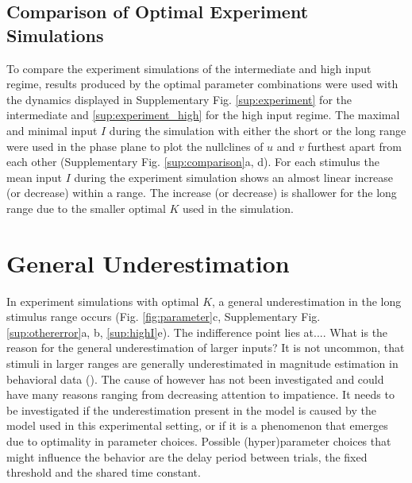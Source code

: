 \documentclass[10pt]{article}
\begin{document}
\subsection{Comparison of Optimal Experiment Simulations}
To compare the experiment simulations of the intermediate and high input regime, results produced by the optimal parameter combinations were used with the dynamics displayed in Supplementary Fig. \ref{sup:experiment} for the intermediate and \ref{sup:experiment_high} for the high input regime.
The maximal and minimal input $I$ during the simulation with either the short or the long range were used in the phase plane to plot the nullclines of $u$ and $v$ furthest apart from each other (Supplementary Fig. \ref{sup:comparison}a, d).
For each stimulus the mean input $I$ during the experiment simulation shows an almost linear increase (or decrease) within a range. The increase (or decrease) is shallower for the long range due to the smaller optimal $K$ used in the simulation. 

\section{General Underestimation}
In experiment simulations with optimal $K$, a general underestimation in the long stimulus range occurs (Fig. \ref{fig:parameter}c, Supplementary Fig. \ref{sup:othererror}a, b, \ref{sup:highI}e).
The indifference point lies at....
What is the reason for the general underestimation of larger inputs? 
It is not uncommon, that stimuli in larger ranges are generally underestimated in magnitude estimation in behavioral data (\cite{Petzschner2012}).
The cause of however has not been investigated and could have many reasons ranging from decreasing attention to impatience. 
It needs to be investigated if the underestimation present in the model is caused by the model used in this experimental setting, or if it is a phenomenon that emerges due to optimality in parameter choices. %
Possible (hyper)parameter choices that might influence the behavior are the delay period between trials, the fixed threshold and the shared time constant. 
\end{document}
